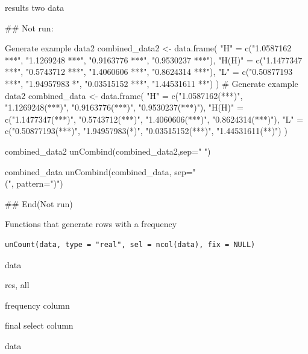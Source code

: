\documentclass[a4paper]{book}
\begin{document}
%
\begin{Value}
results  two data
\end{Value}
%
\begin{Examples}
\begin{ExampleCode}
## Not run: 

Generate example data2
combined_data2 <- data.frame(
  "H" = c("1.0587162 ***", "1.1269248 ***", "0.9163776 ***", "0.9530237 ***"),
  "H(H)" = c("1.1477347 ***", "0.5743712 ***", "1.4060606 ***", "0.8624314 ***"),
  "L" = c("0.50877193 ***", "1.94957983 *", "0.03515152 ***", "1.44531611 **")
)
# Generate example data2
combined_data <- data.frame(
  "H" = c("1.0587162(***)", "1.1269248(***)", "0.9163776(***)", "0.9530237(***)"),
  "H(H)" = c("1.1477347(***)", "0.5743712(***)", "1.4060606(***)", "0.8624314(***)"),
  "L" = c("0.50877193(***)", "1.94957983(*)", "0.03515152(***)", "1.44531611(**)")
)

combined_data2
unCombind(combined_data2,sep=" ")

combined_data
unCombind(combined_data, sep="\\(", pattern=")")



## End(Not run)
\end{ExampleCode}
\end{Examples}
%
\begin{Description}
Functions that generate rows with a frequency
\end{Description}
%
\begin{Usage}
\begin{verbatim}
unCount(data, type = "real", sel = ncol(data), fix = NULL)
\end{verbatim}
\end{Usage}
%
\begin{Arguments}
\begin{ldescription}
\item[\code{data}] data

\item[\code{type}] res, all

\item[\code{sel}] frequency column

\item[\code{fix}] final select column
\end{ldescription}
\end{Arguments}
%
\begin{Value}
data
\end{Value}
\end{document}
